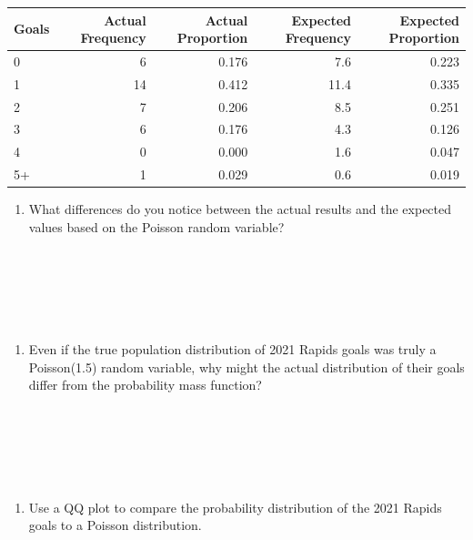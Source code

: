 \documentclass[
  11pt,
]{book}
\providecommand{\tightlist}{%
  \setlength{\itemsep}{0pt}\setlength{\parskip}{0pt}}
\theoremstyle{definition}
\theoremstyle{definition}
\theoremstyle{definition}
\theoremstyle{definition}
\theoremstyle{remark}
\begin{document}
\begin{table}[H]
\centering
\begin{tabular}{lrrrr}
\toprule
Goals & Actual Frequency & Actual Proportion & Expected Frequency & Expected Proportion\\
\midrule
0 & 6 & 0.176 & 7.6 & 0.223\\
1 & 14 & 0.412 & 11.4 & 0.335\\
2 & 7 & 0.206 & 8.5 & 0.251\\
3 & 6 & 0.176 & 4.3 & 0.126\\
4 & 0 & 0.000 & 1.6 & 0.047\\
5+ & 1 & 0.029 & 0.6 & 0.019\\
\bottomrule
\end{tabular}
\end{table}

\begin{enumerate}
\def\labelenumi{(\alph{enumi})}
\setcounter{enumi}{1}
\tightlist
\item
  What differences do you notice between the actual results and the expected values based on the Poisson random variable?\\
  \strut \\
  \strut \\
  \strut \\
  \vfill
\end{enumerate}

\begin{enumerate}
\def\labelenumi{(\alph{enumi})}
\setcounter{enumi}{2}
\tightlist
\item
  Even if the true population distribution of 2021 Rapids goals was truly a Poisson(1.5) random variable, why might the actual distribution of their goals differ from the probability mass function?\\
  \strut \\
  \strut \\
  \strut \\
  \vfill
\end{enumerate}

\newpage

\begin{enumerate}
\def\labelenumi{(\alph{enumi})}
\setcounter{enumi}{3}
\tightlist
\item
  Use a QQ plot to compare the probability distribution of the 2021 Rapids goals to a Poisson distribution.\\
\end{enumerate}
\end{document}
